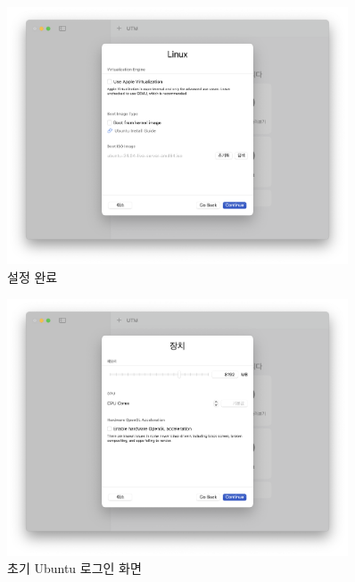 \begin{figure}[htbp]
    \centering
    \includegraphics[width=0.9\textwidth]{images/chapter2Images/ch2_image_08.png}
    \caption{설정 완료}
\end{figure}

\begin{figure}[htbp]
    \centering
    \includegraphics[width=0.9\textwidth]{images/chapter2Images/ch2_image_09.png}
    \caption{초기 Ubuntu 로그인 화면}
\end{figure}

